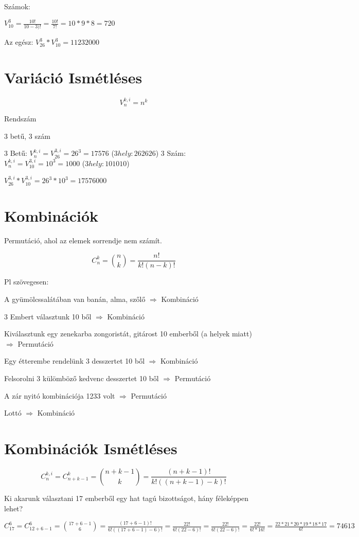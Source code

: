 \documentclass[a4paper,9pt,leqno]{article}
\begin{document}
Számok:

$V_{10}^3 = \frac{10!}{10 - 3)!} = \frac{10!}{7!} = 10 * 9 * 8 = 720$

Az egész:
$V_{26}^3 * V_{10}^3 = 11232000$

\section{Variáció Ismétléses}

$$V_n^{k, i} = n^k$$

Rendszám

3 betű, 3 szám

3 Betű: $V_n^{k, i} = V_{26}^{3, i} = 26^3 =  17576$ ($3 hely : 26 26 26$)
3 Szám: $V_n^{k, i} = V_{10}^{3, i} = 10^3 =  1000$ ($3 hely : 10 10 10$)

$V_{26}^{3, i} * V_{10}^{3, i} = 26^3 * 10^3 = 17576000$

\section{Kombinációk}

Permutáció, ahol az elemek sorrendje nem számít.

$$C_n^k = {{n}\choose{k}} = \frac{n!}{k!(n - k)!} $$

Pl szövegesen:

A gyümölcssalátában van banán, alma, szőlő $\Rightarrow$ Kombináció

3 Embert választunk 10 ből $\Rightarrow$ Kombináció

Kiválasztunk egy zenekarba zongoristát, gitárost 10 emberből (a helyek miatt) $\Rightarrow$ Permutáció

Egy étterembe rendelünk 3 desszertet 10 ből $\Rightarrow$ Kombináció

Felsorolni 3 külömböző kedvenc desszertet 10 ből $\Rightarrow$ Permutáció

A zár nyitó kombinációja 1233 volt $\Rightarrow$ Permutáció

Lottó $\Rightarrow$ Kombináció


\section{Kombinációk Ismétléses}



$$C_n^{k, i} = C_{n + k -1}^k = {{n + k - 1}\choose{k}} = \frac{(n + k - 1)!}{k!((n + k - 1) - k)!} $$


Ki akarunk választani 17 emberből egy hat tagú bizottságot, hány féleképpen lehet?

$C_{17}^6 = C_{12 + 6 - 1}^6 = {{17 + 6 - 1}\choose{6}} = \frac{(17 + 6 - 1)!}{6!((17 + 6 - 1) - 6)!} = \frac{22!}{6!(22 - 6)!} = \frac{22!}{6!(22 - 6)!} = \frac{22!}{6! * 16!} = \frac{22 * 21 * 20 * 19 * 18 * 17}{6!} = 74613 $
\end{document}
